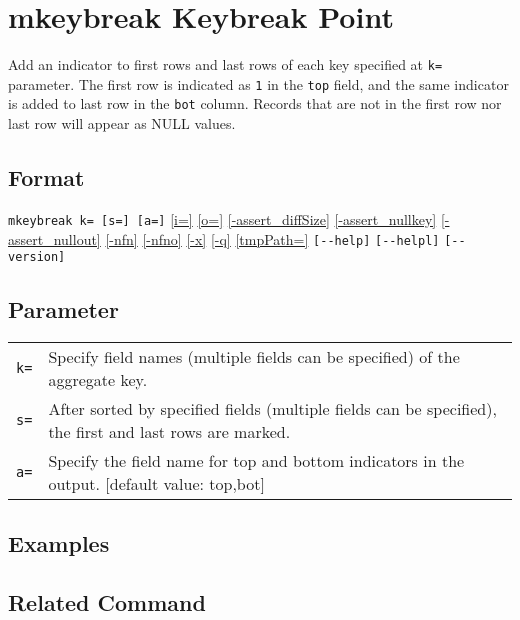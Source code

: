 
%

\section{mkeybreak Keybreak Point\label{sect:mkeybreak}}
Add an indicator to first rows and last rows of each key specified at \verb|k=| parameter. 
The first row is indicated as \verb|1| in the \verb|top| field, and the same indicator is added to last row in the \verb|bot| column. 
Records that are not in the first row nor last row will appear as NULL values. 

\subsection*{Format}
\verb|mkeybreak k= [s=] [a=]|
\hyperref[sect:option_i]{[i=]}
\hyperref[sect:option_o]{[o=]}
\hyperref[sect:option_assert_diffSize]{[-assert\_diffSize]}
\hyperref[sect:option_assert_nullkey]{[-assert\_nullkey]}
\hyperref[sect:option_assert_nullout]{[-assert\_nullout]}
\hyperref[sect:option_nfn]{[-nfn]} 
\hyperref[sect:option_nfno]{[-nfno]}  
\hyperref[sect:option_x]{[-x]}
\hyperref[sect:option_q]{[-q]}
\hyperref[sect:option_option_tmppath]{[tmpPath=]}
\verb|[--help]|
\verb|[--helpl]|
\verb|[--version]|\\

\subsection*{Parameter}
\begin{table}[htbp]
{\small
\begin{tabular}{ll}
\verb|k=|    & Specify field names (multiple fields can be specified) of the aggregate key. \\
\verb|s=|    & After sorted by specified fields (multiple fields can be specified), the first and last rows are marked. \\
\verb|a=|    & Specify the field name for top and bottom indicators in the output. [default value: top,bot]\\
\end{tabular} 
}
\end{table} 

\subsection*{Examples}


\subsection*{Related Command}

%
